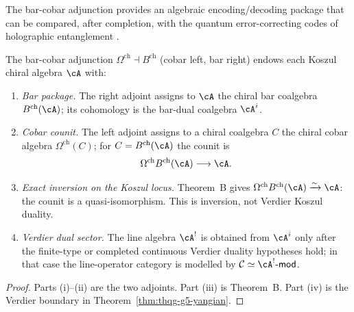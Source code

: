 The bar-cobar adjunction provides an algebraic encoding/decoding
package that can be compared, after completion, with the quantum
error-correcting codes of holographic entanglement
\cite{Almheiri-Dong-Harlow15, Pastawski-Yoshida-Harlow-Preskill15}.

\begin{proposition}
\label{prop:thqg-barcobar-error-correction}
The bar-cobar adjunction
$\Omega^{\mathrm{ch}}\dashv B^{\mathrm{ch}}$ (cobar left, bar right)
endows each Koszul chiral algebra $\cA$ with:
\begin{enumerate}[label=\textup{(\roman*)}]
\item \emph{Bar package.}
 The right adjoint assigns to $\cA$ the chiral bar coalgebra
 $B^{\mathrm{ch}}(\cA)$; its cohomology is the bar-dual coalgebra
 $\cA^i$.

\item \emph{Cobar counit.}
 The left adjoint assigns to a chiral coalgebra $C$ the chiral cobar
 algebra $\Omega^{\mathrm{ch}}(C)$; for $C=B^{\mathrm{ch}}(\cA)$ the
 counit is
 \[
 \Omega^{\mathrm{ch}}B^{\mathrm{ch}}(\cA)\longrightarrow \cA .
 \]

\item \emph{Exact inversion on the Koszul locus.}
 Theorem~B gives
 $\Omega^{\mathrm{ch}}B^{\mathrm{ch}}(\cA) \xrightarrow{\sim} \cA$:
 the counit is a quasi-isomorphism.  This is inversion, not Verdier
 Koszul duality.

\item \emph{Verdier dual sector.}
 The line algebra $\cA^!$ is obtained from $\cA^i$ only after the
 finite-type or completed continuous Verdier duality hypotheses hold;
 in that case the line-operator category is modelled by
 $\mathcal{C} \simeq \cA^!\text{-}\mathsf{mod}$.
\end{enumerate}
\end{proposition}

\begin{proof}
Parts (i)--(ii) are the two adjoints.  Part (iii) is Theorem~B.  Part
(iv) is the Verdier boundary in Theorem~\ref{thm:thqg-g5-yangian}.
\end{proof}

